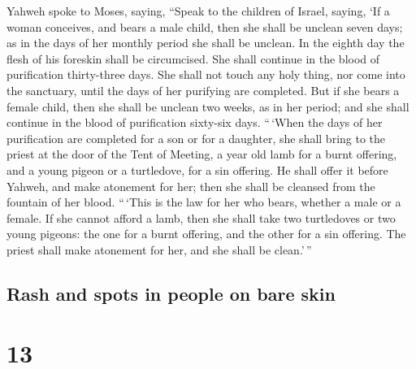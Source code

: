  Yahweh spoke to Moses, saying,  ``Speak to
the children of Israel, saying, `If a woman conceives, and bears a male
child, then she shall be unclean seven days; as in the days of her
monthly period she shall be unclean.  In the eighth day
the flesh of his foreskin shall be circumcised.  She shall
continue in the blood of purification thirty-three days. She shall not
touch any holy thing, nor come into the sanctuary, until the days of her
purifying are completed.  But if she bears a female child,
then she shall be unclean two weeks, as in her period; and she shall
continue in the blood of purification sixty-six days. 
``\,`When the days of her purification are completed for a son or for a
daughter, she shall bring to the priest at the door of the Tent of
Meeting, a year old lamb for a burnt offering, and a young pigeon or a
turtledove, for a sin offering.  He shall offer it before
Yahweh, and make atonement for her; then she shall be cleansed from the
fountain of her blood. ``\,`This is the law for her who bears, whether a
male or a female.  If she cannot afford a lamb, then she
shall take two turtledoves or two young pigeons: the one for a burnt
offering, and the other for a sin offering. The priest shall make
atonement for her, and she shall be clean.'\,''

\hypertarget{rash-and-spots-in-people-on-bare-skin}{%
\subsection{Rash and spots in people on bare
skin}\label{rash-and-spots-in-people-on-bare-skin}}

\hypertarget{section-12}{%
\section{13}\label{section-12}}

